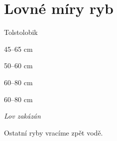 \documentclass[egregdoesnotlikesansseriftitles,a4paper,fontsize=12pt]{scrartcl}
\begin{document}
\section*{Lovné míry ryb}
\begin{labeling}{Tolstolobik\quad}
    \item[Kapr] 45--65 cm
    \item[Amur] 50--60 cm
    \item[Tolstolobik] 60--80 cm
    \item[Štika] 60--80 cm
    \item[Lín] \textit{Lov zakázán}
\end{labeling}
Ostatní ryby vracíme zpět vodě.
\end{document}
